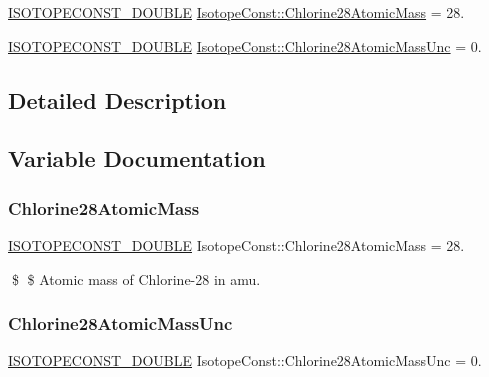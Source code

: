 \begin{DoxyCompactItemize}
\item 
\mbox{\hyperlink{group___isotope_const-_macros_ga8f45a7272ce02c0b4c65c44636ed719a}{I\+S\+O\+T\+O\+P\+E\+C\+O\+N\+S\+T\+\_\+\+D\+O\+U\+B\+LE}} \mbox{\hyperlink{group___isotope_const-_chlorine-_cl28_ga73e9b397a108b46739c476a899be73fb}{Isotope\+Const\+::\+Chlorine28\+Atomic\+Mass}} = 28.
\item 
\mbox{\hyperlink{group___isotope_const-_macros_ga8f45a7272ce02c0b4c65c44636ed719a}{I\+S\+O\+T\+O\+P\+E\+C\+O\+N\+S\+T\+\_\+\+D\+O\+U\+B\+LE}} \mbox{\hyperlink{group___isotope_const-_chlorine-_cl28_gaefac971d9675c4311ffdb48e63b14eb9}{Isotope\+Const\+::\+Chlorine28\+Atomic\+Mass\+Unc}} = 0.
\end{DoxyCompactItemize}


\subsection{Detailed Description}


\subsection{Variable Documentation}
\mbox{\label{group___isotope_const-_chlorine-_cl28_ga73e9b397a108b46739c476a899be73fb}} 
\subsubsection{\texorpdfstring{Chlorine28\+Atomic\+Mass}{Chlorine28AtomicMass}}
{\footnotesize\ttfamily \mbox{\hyperlink{group___isotope_const-_macros_ga8f45a7272ce02c0b4c65c44636ed719a}{I\+S\+O\+T\+O\+P\+E\+C\+O\+N\+S\+T\+\_\+\+D\+O\+U\+B\+LE}} Isotope\+Const\+::\+Chlorine28\+Atomic\+Mass = 28.}

\$ \$ Atomic mass of Chlorine-\/28 in amu. \mbox{\label{group___isotope_const-_chlorine-_cl28_gaefac971d9675c4311ffdb48e63b14eb9}} 
\subsubsection{\texorpdfstring{Chlorine28\+Atomic\+Mass\+Unc}{Chlorine28AtomicMassUnc}}
{\footnotesize\ttfamily \mbox{\hyperlink{group___isotope_const-_macros_ga8f45a7272ce02c0b4c65c44636ed719a}{I\+S\+O\+T\+O\+P\+E\+C\+O\+N\+S\+T\+\_\+\+D\+O\+U\+B\+LE}} Isotope\+Const\+::\+Chlorine28\+Atomic\+Mass\+Unc = 0.}

